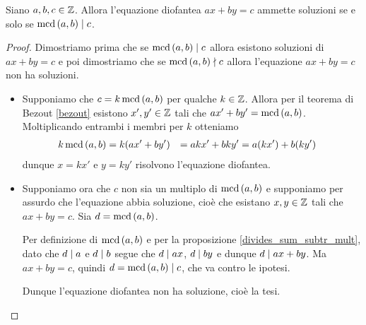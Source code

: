 \begin{theorem}
    Siano $a, b, c \in \mathbb{Z}$. Allora l'equazione diofantea $ax + by = c$ ammette soluzioni se e solo se $\operatorname{mcd}\left(a, b\right) \mid c$.
\end{theorem}
\begin{proof}
    Dimostriamo prima che se $\operatorname{mcd}\left(a, b\right) \mid c$ allora esistono soluzioni di $ax + by = c$ e poi dimostriamo che se $\operatorname{mcd}\left(a, b\right) \nmid c$ allora l'equazione $ax + by = c$ non ha soluzioni.
    \begin{itemize}
        \item Supponiamo che $c = k\operatorname{mcd}\left(a, b\right)$ per qualche $k \in \mathbb{Z}$. Allora per il teorema di Bezout \ref{bezout} esistono $x', y^\prime \in \mathbb{Z}$ tali che $ax^\prime + by^\prime = \operatorname{mcd}\left(a, b\right)$. Moltiplicando  entrambi i membri per $k$ otteniamo
        \begin{alignat*}{2} 
            k\operatorname{mcd}\left(a, b\right) &= k(ax^\prime + by')
                        &= akx^\prime + bky'
                        &= a(kx') + b(ky')
        \end{alignat*}
        dunque $x = kx'$ e $y = ky'$ risolvono l'equazione diofantea.
        \item Supponiamo ora che $c$ non sia un multiplo di $\operatorname{mcd}\left(a, b\right)$ e supponiamo per assurdo che l'equazione abbia soluzione, cioè che esistano $x, y \in \mathbb{Z}$ tali che $ax + by = c$. Sia $d = \operatorname{mcd}\left(a, b\right)$.
        
        Per definizione di $\operatorname{mcd}\left(a, b\right)$ e per la proposizione \ref{divides_sum_subtr_mult}, dato che $d \mid a$ e $d \mid b$ segue che $d \mid ax$, $d \mid by$ e dunque $d \mid ax + by$. Ma $ax + by = c$, quindi $d = \operatorname{mcd}\left(a, b\right) \mid c$, che va contro le ipotesi.

        Dunque l'equazione diofantea non ha soluzione, cioè la tesi. \qedhere
    \end{itemize}
\end{proof}

